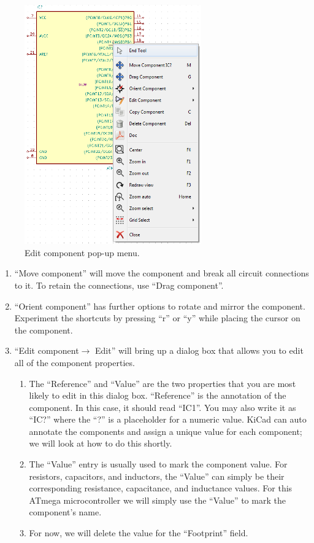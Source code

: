 \documentclass[12pt,letterpaper]{scrartcl}
\begin{document}
\begin{enumerate}
\begin{enumerate}
			\begin{figure}[h]
				\centering
				\includegraphics[width=3in]{edit-component}
				\caption{Edit component pop-up menu.}
				\label{fig:edit-component}
			\end{figure}

				\begin{enumerate}
					\item ``Move component'' will move the component and break all circuit connections to it. To retain the connections, use ``Drag component''. 
					\item ``Orient component'' has further options to rotate and mirror the component. Experiment the shortcuts by pressing ``r'' or ``y'' while placing the cursor on the component.
					\item ``Edit component$\rightarrow$ Edit'' will bring up a dialog box that allows you to edit all of the component properties. 
						\begin{enumerate}
							\item The ``Reference'' and ``Value'' are the two properties that you are most likely to edit in this dialog box. ``Reference'' is the annotation of the component. In this case, it should read ``IC1''. You may also write it as ``IC?'' where the ``?'' is a placeholder for a numeric value. KiCad can auto annotate the components and assign a unique value for each component; we will look at how to do this shortly.
							\item The ``Value'' entry is usually used to mark the component value. For resistors, capacitors, and inductors, the ``Value'' can simply be their corresponding resistance, capacitance, and inductance values. For this ATmega microcontroller we will simply use the ``Value'' to mark the component’s name. 
							\item For now, we will delete the value for the ``Footprint'' field. 
						\end{enumerate}
				\end{enumerate}
		\end{enumerate}


\end{enumerate}
\end{document}
